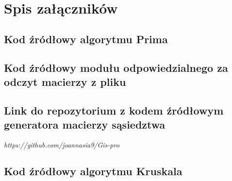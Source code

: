 \setcounter{secnumdepth}{-1}

\chapter{Spis załączników}
\setcounter{secnumdepth}{3}

\setcounter{section}{0}
\renewcommand{\thesection}{\arabic{section}}
\newcommand{\CDlitera}{$\Xi$/}

\section{Kod źródłowy algorytmu Prima}
\section{Kod źródłowy modułu odpowiedzialnego za odczyt macierzy z pliku}
\section{Link do repozytorium z kodem źródłowym generatora macierzy sąsiedztwa}
\begin{center}
	\emph{https://github.com/joannasia9/Gis-pro}
\end{center}
\section{Kod źródłowy algorytmu Kruskala}
